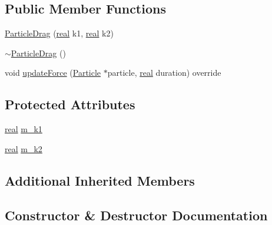 \subsection*{Public Member Functions}
\begin{DoxyCompactItemize}
\item 
\mbox{\hyperlink{classrum_1_1_particle_drag_a8489f5c5deb622003656afc4989e71bb}{Particle\+Drag}} (\mbox{\hyperlink{namespacerum_a7e8cca23573d5eaead0f138cbaa4862c}{real}} k1, \mbox{\hyperlink{namespacerum_a7e8cca23573d5eaead0f138cbaa4862c}{real}} k2)
\item 
\mbox{\hyperlink{classrum_1_1_particle_drag_a21072ca38b82529540f361a24cbec508}{$\sim$\+Particle\+Drag}} ()
\item 
void \mbox{\hyperlink{classrum_1_1_particle_drag_a61c989e4a66ae25372c5983178067525}{update\+Force}} (\mbox{\hyperlink{classrum_1_1_particle}{Particle}} $\ast$particle, \mbox{\hyperlink{namespacerum_a7e8cca23573d5eaead0f138cbaa4862c}{real}} duration) override
\end{DoxyCompactItemize}
\subsection*{Protected Attributes}
\begin{DoxyCompactItemize}
\item 
\mbox{\hyperlink{namespacerum_a7e8cca23573d5eaead0f138cbaa4862c}{real}} \mbox{\hyperlink{classrum_1_1_particle_drag_ad4fcf721667ea70b2ee8ca5ddac9d0ed}{m\+\_\+k1}}
\item 
\mbox{\hyperlink{namespacerum_a7e8cca23573d5eaead0f138cbaa4862c}{real}} \mbox{\hyperlink{classrum_1_1_particle_drag_a30f863703e55b68316c64c6f9a8cc25f}{m\+\_\+k2}}
\end{DoxyCompactItemize}
\subsection*{Additional Inherited Members}


\subsection{Constructor \& Destructor Documentation}
\mbox{\label{classrum_1_1_particle_drag_a8489f5c5deb622003656afc4989e71bb}} 
